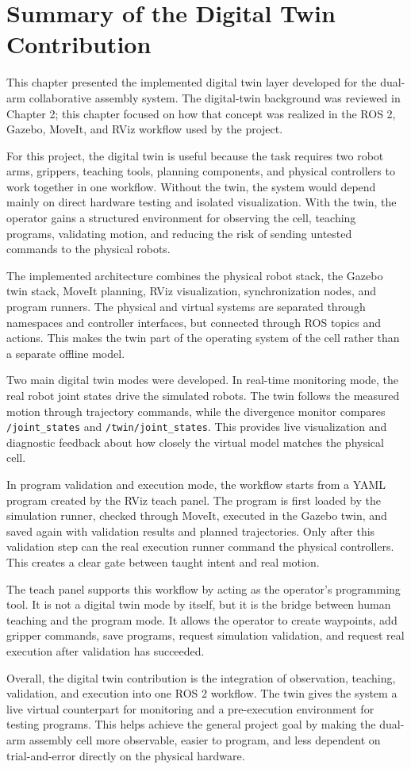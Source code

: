 \section{Summary of the Digital Twin Contribution}

This chapter presented the implemented digital twin layer developed for the dual-arm collaborative assembly system. The digital-twin background was reviewed in Chapter 2; this chapter focused on how that concept was realized in the ROS 2, Gazebo, MoveIt, and RViz workflow used by the project.

For this project, the digital twin is useful because the task requires two robot arms, grippers, teaching tools, planning components, and physical controllers to work together in one workflow. Without the twin, the system would depend mainly on direct hardware testing and isolated visualization. With the twin, the operator gains a structured environment for observing the cell, teaching programs, validating motion, and reducing the risk of sending untested commands to the physical robots.

The implemented architecture combines the physical robot stack, the Gazebo twin stack, MoveIt planning, RViz visualization, synchronization nodes, and program runners. The physical and virtual systems are separated through namespaces and controller interfaces, but connected through ROS topics and actions. This makes the twin part of the operating system of the cell rather than a separate offline model.

Two main digital twin modes were developed. In real-time monitoring mode, the real robot joint states drive the simulated robots. The twin follows the measured motion through trajectory commands, while the divergence monitor compares \texttt{/joint\_states} and \texttt{/twin/joint\_states}. This provides live visualization and diagnostic feedback about how closely the virtual model matches the physical cell.

In program validation and execution mode, the workflow starts from a YAML program created by the RViz teach panel. The program is first loaded by the simulation runner, checked through MoveIt, executed in the Gazebo twin, and saved again with validation results and planned trajectories. Only after this validation step can the real execution runner command the physical controllers. This creates a clear gate between taught intent and real motion.

The teach panel supports this workflow by acting as the operator's programming tool. It is not a digital twin mode by itself, but it is the bridge between human teaching and the program mode. It allows the operator to create waypoints, add gripper commands, save programs, request simulation validation, and request real execution after validation has succeeded.

Overall, the digital twin contribution is the integration of observation, teaching, validation, and execution into one ROS 2 workflow. The twin gives the system a live virtual counterpart for monitoring and a pre-execution environment for testing programs. This helps achieve the general project goal by making the dual-arm assembly cell more observable, easier to program, and less dependent on trial-and-error directly on the physical hardware.
